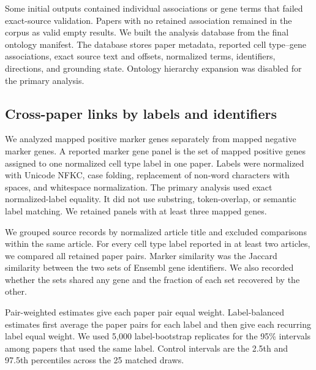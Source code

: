 \documentclass[10pt,twocolumn]{article}
\theoremstyle{plain}
\theoremstyle{definition}
\theoremstyle{remark}
\begin{document}
Some initial outputs contained individual associations or gene terms that failed exact-source validation.  Papers with no retained association remained in the corpus as valid empty results. We built the analysis database from the final ontology manifest. The database stores paper metadata, reported cell type--gene associations, exact source text and offsets, normalized terms, identifiers, directions, and grounding state. Ontology hierarchy expansion was disabled for the primary analysis.

\subsection{Cross-paper links by labels and identifiers}

We analyzed mapped positive marker genes separately from mapped negative marker genes. A reported marker gene panel is the set of mapped positive genes assigned to one normalized cell type label in one paper. Labels were normalized with Unicode NFKC, case folding, replacement of non-word characters with spaces, and whitespace normalization. The primary analysis used exact normalized-label equality. It did not use substring, token-overlap, or semantic label matching. We retained panels with at least three mapped genes.

We grouped source records by normalized article title and excluded comparisons within the same article. For every cell type label reported in at least two articles, we compared all retained paper pairs. Marker similarity was the Jaccard similarity between the two sets of Ensembl gene identifiers. We also recorded whether the sets shared any gene and the fraction of each set recovered by the other.

 Pair-weighted estimates give each paper pair equal weight. Label-balanced estimates first average the paper pairs for each label and then give each recurring label equal weight. We used 5{,}000 label-bootstrap replicates for the 95\% intervals among papers that used the same label. Control intervals are the 2.5th and 97.5th percentiles across the 25 matched draws.
\end{document}
